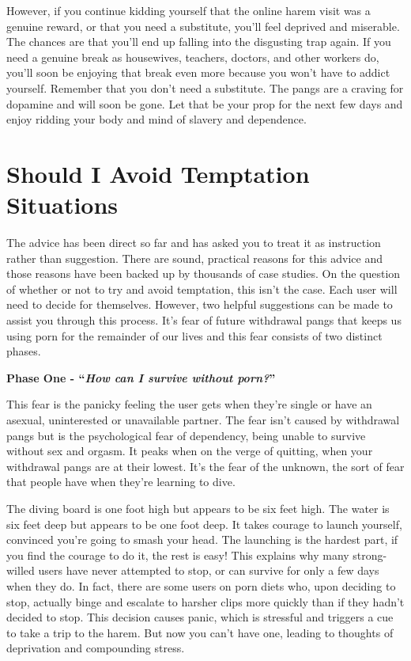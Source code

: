 \documentclass[
]{book}
\begin{document}
However, if you continue kidding yourself that the online harem visit was a genuine reward, or that you need a substitute, you'll feel deprived and miserable. The chances are that you'll end up falling into the disgusting trap again. If you need a genuine break as housewives, teachers, doctors, and other workers do, you'll soon be enjoying that break even more because you won't have to addict yourself. Remember that you don't need a substitute. The pangs are a craving for dopamine and will soon be gone. Let that be your prop for the next few days and enjoy ridding your body and mind of slavery and dependence.

\hypertarget{should-i-avoid-temptation-situations}{%
\chapter{Should I Avoid Temptation Situations}\label{should-i-avoid-temptation-situations}}

The advice has been direct so far and has asked you to treat it as instruction rather than suggestion. There are sound, practical reasons for this advice and those reasons have been backed up by thousands of case studies. On the question of whether or not to try and avoid temptation, this isn't the case. Each user will need to decide for themselves. However, two helpful suggestions can be made to assist you through this process. It's fear of future withdrawal pangs that keeps us using porn for the remainder of our lives and this fear consists of two distinct phases.

\textbf{Phase One - ``\emph{How can I survive without porn?}''}

This fear is the panicky feeling the user gets when they're single or have an asexual, uninterested or unavailable partner. The fear isn't caused by withdrawal pangs but is the psychological fear of dependency, being unable to survive without sex and orgasm. It peaks when on the verge of quitting, when your withdrawal pangs are at their lowest. It's the fear of the unknown, the sort of fear that people have when they're learning to dive.

The diving board is one foot high but appears to be six feet high. The water is six feet deep but appears to be one foot deep. It takes courage to launch yourself, convinced you're going to smash your head. The launching is the hardest part, if you find the courage to do it, the rest is easy! This explains why many strong-willed users have never attempted to stop, or can survive for only a few days when they do. In fact, there are some users on porn diets who, upon deciding to stop, actually binge and escalate to harsher clips more quickly than if they hadn't decided to stop. This decision causes panic, which is stressful and triggers a cue to take a trip to the harem. But now you can't have one, leading to thoughts of deprivation and compounding stress.
\end{document}
